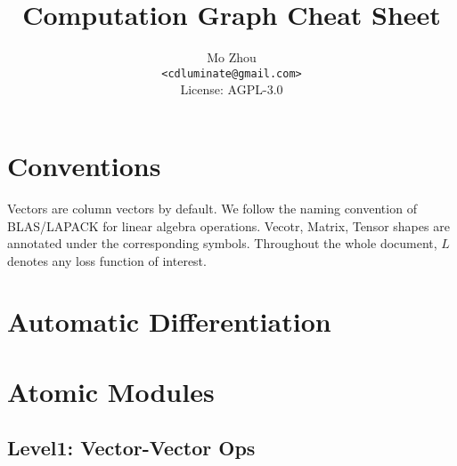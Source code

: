 \documentclass[9pt,twocolumn,times]{article}
\title{Computation Graph Cheat Sheet}
\author{Mo Zhou\\\small\texttt{<cdluminate@gmail.com>}\\
License: AGPL-3.0}
\begin{document}
\maketitle
\tableofcontents
\newpage

\section{Conventions}

Vectors are column vectors by default.
We follow the naming convention of BLAS/LAPACK for linear algebra operations.
Vecotr, Matrix, Tensor shapes are annotated under the corresponding symbols.
Throughout the whole document, $L$ denotes any loss function of interest.

\section{Automatic Differentiation}

\section{Atomic Modules}

\subsection{Level1: Vector-Vector Ops}
\end{document}
